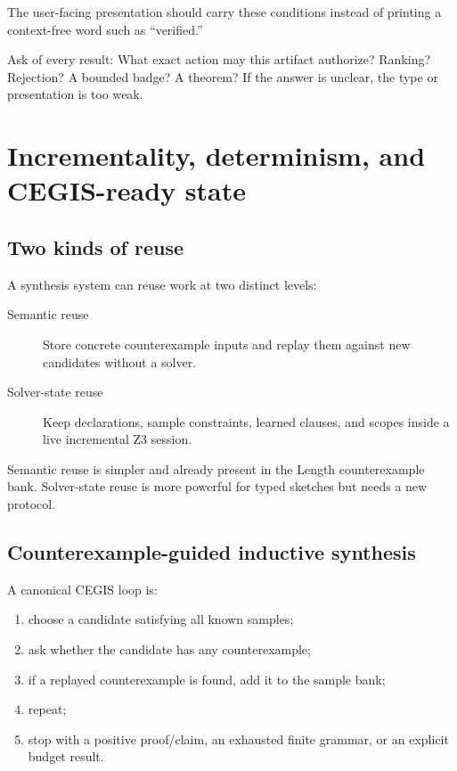 \documentclass[10pt,letterpaper,oneside]{report}
\begin{document}
The user-facing presentation should carry these conditions instead of printing a context-free word such as ``verified.''

\begin{checkpoint}
Ask of every result: What exact action may this artifact authorize? Ranking? Rejection? A bounded badge? A theorem? If the answer is unclear, the type or presentation is too weak.
\end{checkpoint}

\chapter{Incrementality, determinism, and CEGIS-ready state}
\label{chap:incrementality}

\section{Two kinds of reuse}

A synthesis system can reuse work at two distinct levels:

\begin{description}
\item[Semantic reuse] Store concrete counterexample inputs and replay them against new candidates without a solver.
\item[Solver-state reuse] Keep declarations, sample constraints, learned clauses, and scopes inside a live incremental Z3 session.
\end{description}

Semantic reuse is simpler and already present in the Length counterexample bank. Solver-state reuse is more powerful for typed sketches but needs a new protocol.

\section{Counterexample-guided inductive synthesis}

A canonical CEGIS loop is:

\begin{enumerate}
\item choose a candidate satisfying all known samples;
\item ask whether the candidate has any counterexample;
\item if a replayed counterexample is found, add it to the sample bank;
\item repeat;
\item stop with a positive proof/claim, an exhausted finite grammar, or an explicit budget result.
\end{enumerate}
\end{document}
